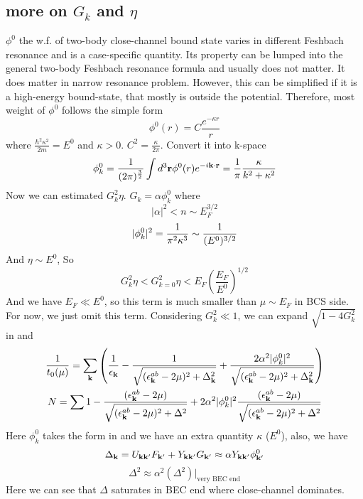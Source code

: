 \subsection{more on $G_{k}$ and $\eta$}
$\phi^{0}$ the w.f. of two-body close-channel bound state varies in different Feshbach resonance and is a case-specific quantity.  Its property can be lumped into the general two-body Feshbach resonance formula and usually does not matter.  It does matter in narrow resonance problem.  However, this can be simplified if it is a high-energy bound-state, that mostly is outside the potential.  Therefore, most weight of $\phi^{0}$ follows the simple form 
\[
\phi^{0}(r)=C\frac{e^{-\kappa{r}}}{r}
\]
 where $\frac{\hbar^{2}\kappa^{2}}{2m}=E^{0}$ and $\kappa>0$.  $C^{2}=\frac{\kappa}{2\pi}$.  Convert it into k-space
 \begin{equation}\label{eq:20101011:phi}
\phi^{0}_k=\frac{1}{(2\pi)^{\frac32}}\int{d^{3}\ensuremath{\mathbf{r}}\phi^{0}(r)e^{-i\ensuremath{\mathbf{k}}\cdot\ensuremath{\mathbf{r}}}}=\frac{1}{\pi}\frac{\kappa}{k^{2}+\kappa^{2}}
\end{equation}
Now we can estimated $G_{k}^{2}\eta$. $G_{k}=\alpha\phi^{0}_{k}$ where 
\[|\alpha|^{2}<n\sim{E_{F}^{3/2}}\]
\[
\lvert{\phi^{0}_{k}}\rvert^{2}=\frac{1}{\pi^{2}\kappa^{3}}\sim\frac{1}{(E^{0})^{3/2}}
\]
And $\eta\sim{E^{0}}$, So 
\[
G_{k}^{2}\eta<G_{k=0}^{2}\eta<E_{F}(\frac{E_{F}}{E^{0}})^{1/2}
\]
And we have $E_{F}\ll{E^{0}}$, so this term is much smaller than $\mu\sim{E_{F}}$ in BCS side. For now, we just omit this term.  Considering $G_{k}^{2}\ll1$, we can expand $\sqrt{1-4G_{k}^{2}}$ in  and  
\begin{gather}
\frac{1}{{t_{0}}(\mu)}=\sum_{\mathbf{k}}
\left(\frac{1}{\epsilon_{\mathbf{k}}}-\frac{1}{\sqrt{{(\epsilon^{ab}_{\mathbf{k}}-2\mu)^{2}+\Delta_{\mathbf{k}}^{2}}}}
+\frac{2\alpha^{2}|\phi^{0}_{k}|^{2}}{\sqrt{{(\epsilon^{ab}_{\mathbf{k}}-2\mu)^{2}+\Delta_{\mathbf{k}}^{2}}}}\right)
\\
N=\sum{1-\frac{(\epsilon^{ab}_{\ensuremath{\mathbf{k}}}-2\mu)}{{\sqrt{{(\epsilon^{ab}_{\ensuremath{\mathbf{k}}}-2\mu)^{2}+\Delta^{2}}}}}
+2\alpha^{2}|\phi^{0}_{k}|^{2}\frac{(\epsilon^{ab}_{\ensuremath{\mathbf{k}}}-2\mu)}{{\sqrt{{(\epsilon^{ab}_{\ensuremath{\mathbf{k}}}-2\mu)^{2}+\Delta^{2}}}}}}
\end{gather}
Here $\phi^{0}_{k}$ takes the form in  and we have an extra quantity $\kappa$ ($E^{0}$), also, we have 
\begin{equation}
\Delta_{\mathbf{k}}=U_{\mathbf{k}\mathbf{k}'}F_{\mathbf{k}'}+Y_{\mathbf{k}\mathbf{k}'}G_{\mathbf{k}'}\approx\alpha{Y_{\ensuremath{\mathbf{k}}\ensuremath{\mathbf{k}}'}\phi^{0}_{\ensuremath{\mathbf{k}}'}}
\end{equation}
\[\Delta^{2}\approx\alpha^{2}(\Delta^{2})|_{\text{very BEC end}}
\]
Here we can see that $\Delta$ saturates in BEC end where close-channel dominates.  